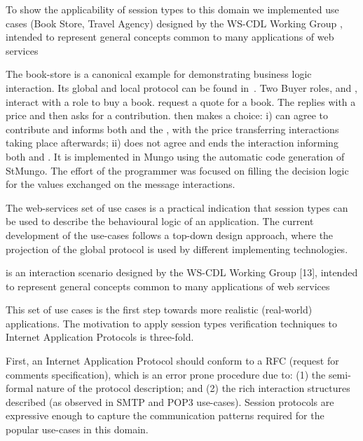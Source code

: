 To show the applicability of session types to
this domain we implemented use cases
(Book Store, Travel Agency) designed
by the WS-CDL Working Group \cite{W3C},
intended to represent general concepts common
to many applications of web services

The book-store is a canonical example for demonstrating 
business logic interaction.
Its global and \BuyerOne local protocol
can be found in~. Two
Buyer roles, \BuyerOne and \BuyerTwo, interact with a \Seller
role to buy a book. \BuyerOne request a quote for a book.
The \Seller replies with a price and then \BuyerOne asks
\BuyerTwo for a contribution. \BuyerTwo then makes a choice:
i) \BuyerTwo can agree to contribute and informs both \BuyerOne
and the \Seller, with the price transferring interactions taking
place afterwards; ii) \BuyerTwo does not agree and ends the interaction
informing both \BuyerOne and \Seller.
%
It is implemented in Mungo using the automatic code generation of
StMungo. The effort of the programmer was focused on filling the
decision logic for the values exchanged on the message interactions.


The web-services set of use cases is a practical indication that session
types can be used to describe the behavioural logic of an application.
The current development of the use-cases follows a top-down
design approach, where the projection of the global protocol is
used by different implementing technologies.

is an interaction scenario designed
by the WS-CDL Working Group [13], intended to represent general concepts
common to many applications of web services


This set of use cases is the first step towards
more realistic (real-world) applications.
The motivation to apply session types verification
techniques to Internet Application Protocols is three-fold.

First, an Internet Application Protocol should conform to
a RFC (request for comments specification), which is an error prone
procedure due to:
(1) the semi-formal nature of the protocol description; and
(2) the rich interaction structures described
(as observed in SMTP and POP3 use-cases).
Session protocols %
are expressive enough to capture the communication
patterns required for the popular use-cases in this domain.  


